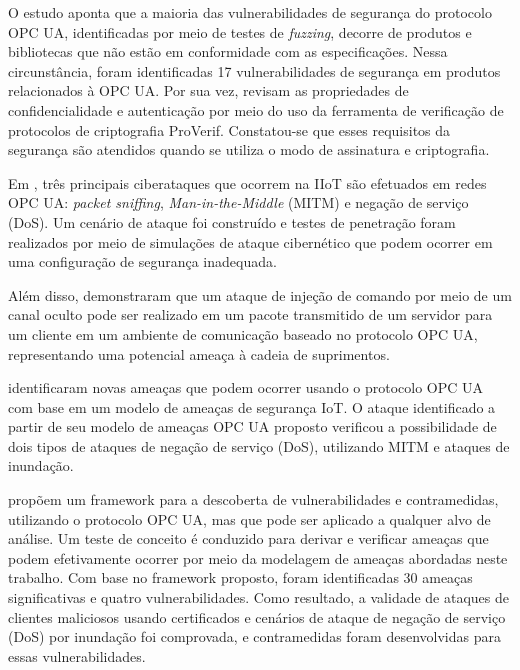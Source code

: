     O estudo \cite{kaspersky2018} aponta que a maioria das vulnerabilidades de segurança do protocolo OPC UA, identificadas por meio de testes de \textit{fuzzing}, decorre de produtos e bibliotecas que não estão em conformidade com as especificações. Nessa circunstância, foram identificadas 17 vulnerabilidades de segurança em produtos relacionados à OPC UA. Por sua vez,  revisam as propriedades de confidencialidade e autenticação por meio do uso da ferramenta de verificação de protocolos de criptografia ProVerif. Constatou-se que esses requisitos da segurança são atendidos quando se utiliza o modo de assinatura e criptografia.

    Em \cite{varadarajan2022}, três principais ciberataques que ocorrem na IIoT são efetuados em redes OPC UA: \textit{packet sniffing}, \textit{Man-in-the-Middle} (MITM) e negação de serviço (DoS). Um cenário de ataque foi construído e testes de penetração foram realizados por meio de simulações de ataque cibernético que podem ocorrer em uma configuração de segurança inadequada.

    Além disso,  demonstraram que um ataque de injeção de comando por meio de um canal oculto pode ser realizado em um pacote transmitido de um servidor para um cliente em um ambiente de comunicação baseado no protocolo OPC UA, representando uma potencial ameaça à cadeia de suprimentos.
    
     identificaram novas ameaças que podem ocorrer usando o protocolo OPC UA com base em um modelo de ameaças de segurança IoT. O ataque identificado a partir de seu modelo de ameaças OPC UA proposto verificou a possibilidade de dois tipos de ataques de negação de serviço (DoS), utilizando MITM e ataques de inundação.

     propõem um framework para a descoberta de vulnerabilidades e contramedidas, utilizando o protocolo OPC UA, mas que pode ser aplicado a qualquer alvo de análise. Um teste de conceito é conduzido para derivar e verificar ameaças que podem efetivamente ocorrer por meio da modelagem de ameaças abordadas neste trabalho. Com base no framework proposto, foram identificadas 30 ameaças significativas e quatro vulnerabilidades. Como resultado, a validade de ataques de clientes maliciosos usando certificados e cenários de ataque de negação de serviço (DoS) por inundação foi comprovada, e contramedidas foram desenvolvidas para essas vulnerabilidades.
